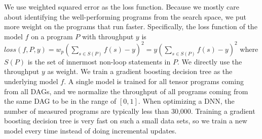 We use weighted squared error as the loss function. Because we mostly care about identifying the well-performing programs from the search space, we put more weight on the programs that run faster.
Specifically, the loss function of the model $f$ on a program $P$ with throughput $y$ is 
$ loss(f, P, y) = w_p (\sum_{s \in S(P)} f(s) - y )^2 =  y (\sum_{s \in S(P)} f(s) - y)^2  $
where $S(P)$ is the set of innermost non-loop statements in $P$. We directly use the throughput $y$ as weight.
We train a gradient boosting decision tree \cite{chen2016xgboost} as the underlying model $f$. A single model is trained for all tensor programs coming from all DAGs, and we normalize the throughput of all programs coming from the same DAG to be in the range of $[0, 1]$.
When optimizing a DNN, the number of measured programs are typically less than 30,000.
Training a gradient boosting decision tree is very fast on such a small data sets, so we train a new model every time instead of doing incremental updates.






